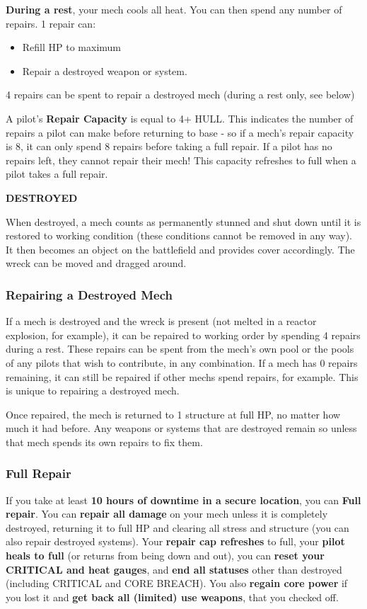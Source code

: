 \textbf{During a rest}, your mech cools all heat. You can then spend any number of repairs. 1 repair can:
\begin{itemize}
\item Refill HP to maximum 
\item Repair a destroyed weapon or system. 
\end{itemize}  
4 repairs can be spent to repair a destroyed mech (during a rest only, see below) 

A pilot's \textbf{Repair Capacity} is equal to 4+ HULL. This indicates the number of repairs a pilot can make before returning to base - so if a mech's repair capacity is 8, it can only spend 8 repairs before taking a full repair. If a pilot has no repairs left, they cannot repair their mech! This capacity refreshes to full when a pilot takes a full repair. 

\begin{center}
  \textbf{DESTROYED}
\end{center}

When destroyed, a mech counts as permanently stunned and shut down until it is restored to working condition (these conditions cannot be removed in any way). It then becomes an object on the battlefield and provides cover accordingly. The wreck can be moved and dragged around.

\subsubsection{Repairing a Destroyed Mech}

If a mech is destroyed and the wreck is present (not melted in a reactor explosion, for example), it can be repaired to working order by spending 4 repairs during a rest. These repairs can be spent from the mech's own pool or the pools of any pilots that wish to contribute, in any combination. If a mech has 0 repairs remaining, it can still be repaired if other mechs spend repairs, for example. This is unique to repairing a destroyed mech.

Once repaired, the mech is returned to 1 structure at full HP, no matter how much it had before. Any weapons or systems that are destroyed remain so unless that mech spends its own repairs to fix them.

\subsubsection{Full Repair}

If you take at least \textbf{10 hours of downtime in a secure location}, you can \textbf{Full repair}. You can \textbf{repair all damage} on your mech unless it is completely destroyed, returning it to full HP and clearing all stress and structure (you can also repair destroyed systems). Your \textbf{repair cap refreshes} to full, your \textbf{pilot heals to full} (or returns from being down and out), you can \textbf{reset your CRITICAL and heat gauges}, and \textbf{end all statuses} other than destroyed (including CRITICAL and CORE BREACH). You also \textbf{regain core power} if you lost it and \textbf{get back all (limited) use weapons}, that you checked off.

